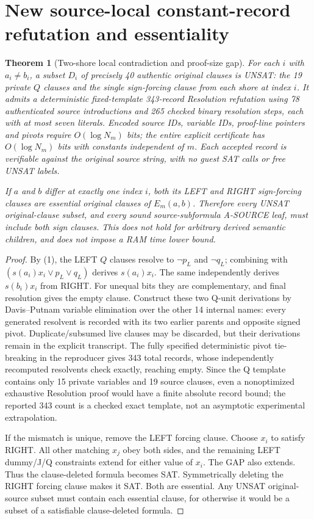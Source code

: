 \documentclass[11pt]{article}
\newtheorem{theorem}{Theorem}
\begin{document}
\section{New source-local constant-record refutation and essentiality}
\begin{theorem}[Two-shore local contradiction and proof-size gap]\label{th:local}
For each $i$ with $a_i\ne b_i$, a subset $D_i$ of precisely 40 authentic original clauses is UNSAT: the 19 private $Q$ clauses and the single sign-forcing clause from each shore at index $i$. It admits a deterministic fixed-template 343-record Resolution refutation using 78 authenticated source introductions and 265 checked binary resolution steps, each with at most seven literals. Encoded source IDs, variable IDs, proof-line pointers and pivots require $O(\log N_m)$ bits; the entire explicit certificate has $O(\log N_m)$ bits with constants independent of $m$. Each accepted record is verifiable against the original source string, with no guest SAT calls or free UNSAT labels.

If $a$ and $b$ differ at exactly one index $i$, \emph{both} its LEFT and RIGHT sign-forcing clauses are essential original clauses of $E_m(a,b)$. Therefore every UNSAT original-clause subset, and every sound source-subformula A-SOURCE leaf, must include both sign clauses. This does not hold for arbitrary derived semantic children, and does not impose a RAM time lower bound.
\end{theorem}
\begin{proof}
By (1), the LEFT $Q$ clauses resolve to $\neg p_L$ and $\neg q_L$; combining with $(s(a_i)x_i\vee p_L\vee q_L)$ derives $s(a_i)x_i$. The same independently derives $s(b_i)x_i$ from RIGHT. For unequal bits they are complementary, and final resolution gives the empty clause. Construct these two Q-unit derivations by Davis--Putnam variable elimination over the other 14 internal names: every generated resolvent is recorded with its two earlier parents and opposite signed pivot. Duplicate/subsumed live clauses may be discarded, but their derivations remain in the explicit transcript. The fully specified deterministic pivot tie-breaking in the reproducer gives 343 total records, whose independently recomputed resolvents check exactly, reaching empty. Since the Q template contains only 15 private variables and 19 source clauses, even a nonoptimized exhaustive Resolution proof would have a finite absolute record bound; the reported 343 count is a checked exact template, not an asymptotic experimental extrapolation.

If the mismatch is unique, remove the LEFT forcing clause. Choose $x_i$ to satisfy RIGHT. All other matching $x_j$ obey both sides, and the remaining LEFT dummy/J/Q constraints extend for either value of $x_i$. The GAP also extends. Thus the clause-deleted formula becomes SAT. Symmetrically deleting the RIGHT forcing clause makes it SAT. Both are essential. Any UNSAT original-source subset must contain each essential clause, for otherwise it would be a subset of a satisfiable clause-deleted formula.\end{proof}
\end{document}
